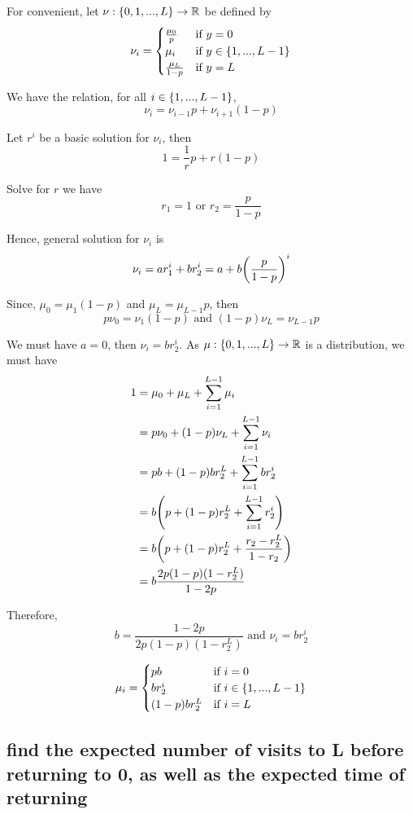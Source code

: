 \documentclass{article}
\begin{document}
For convenient, let $\nu: \{0, 1, ..., L\} \to \mathbb{R}$ be defined by 
$$
    \nu_i = \begin{cases}
        \frac{\mu_0}{p} &\text{if $y = 0$} \\
        \mu_i &\text{if $y \in \{1, ..., L-1\}$} \\
        \frac{\mu_L}{1-p} &\text{if $y = L$} \\
    \end{cases}
$$

We have the relation, for all $i \in \{1, ..., L-1\}$,
$$
    \nu_i = \nu_{i-1} p + \nu_{i+1} (1-p)
$$

Let $r^i$ be a basic solution for $\nu_i$, then
$$
    1 = \frac{1}{r} p + r (1-p)
$$

Solve for $r$ we have
$$
    r_1 = 1 \text{ or } r_2 = \frac{p}{1-p}
$$

Hence, general solution for $\nu_i$ is
$$
    \nu_i = a r_1^i + b r_2^i = a + b \tuple*{\frac{p}{1-p}}^i
$$

Since, $\mu_0 = \mu_1(1-p)$ and $\mu_L = \mu_{L-1} p$, then
$$
    p \nu_0 = \nu_1(1-p) \text{ and } (1-p) \nu_L = \nu_{L-1} p
$$

We must have $a = 0$, then $\nu_i = b r_2^i$. As $\mu: \{0, 1, ..., L\} \to \mathbb{R}$ is a distribution, we must have
\begin{align*}
    1
    &= \mu_0 + \mu_L + \sum_{i=1}^{L-1} \mu_i \\
    &= p \nu_0 + (1-p) \nu_L + \sum_{i=1}^{L-1} \nu_i \\
    &= p b + (1-p) b r_2^L + \sum_{i=1}^{L-1} b r_2^i \\
    &= b \tuple*{p + (1-p) r_2^L + \sum_{i=1}^{L-1} r_2^i} \\
    &= b \tuple*{p + (1-p) r_2^L + \frac{r_2 - r_2^L}{1 - r_2}} \\
    &= b \frac{2p(1-p)(1-r_2^L)}{1 - 2p}
\end{align*}

Therefore,
$$
    b = \frac{1 - 2p}{2p(1-p)(1-r_2^L)} \text{ and } \nu_i = b r_2^i
$$

$$
    \mu_i = \begin{cases}
        p b &\text{if $i = 0$} \\
        b r_2^i &\text{if $i \in \{1, ..., L-1\}$} \\
        (1-p) b r_2^L &\text{if $i = L$} \\
    \end{cases}
$$

\subsection{find the expected number of visits to L before
returning to 0, as well as the expected time of returning}
\end{document}
